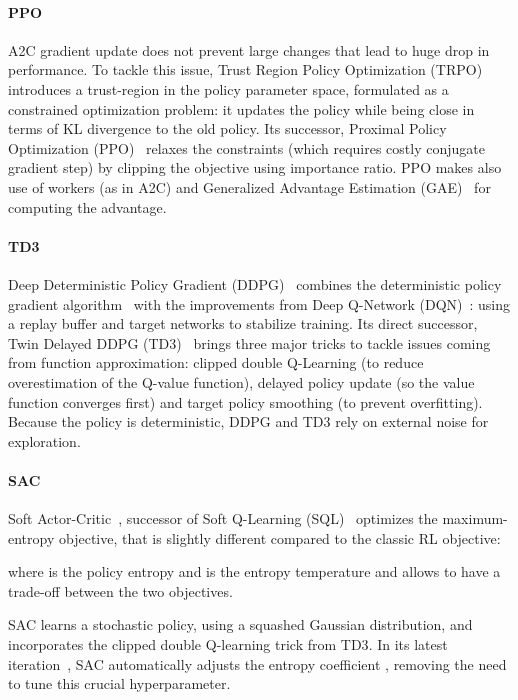 \documentclass{article}
\newcommand{\aac}{\textsc{A2C}\xspace}
\newcommand{\ppo}{\textsc{PPO}\xspace}
\newcommand{\sac}{\textsc{SAC}\xspace}
\newcommand{\tddd}{\textsc{TD3}\xspace}
\begin{document}
\paragraph{\ppo}
\aac gradient update does not prevent large changes that lead to huge drop in performance.
To tackle this issue, Trust Region Policy Optimization (TRPO)~\citep{schulman2015trust} introduces a trust-region in the policy parameter space, formulated as a constrained optimization problem: it updates the policy while being close in terms of KL divergence to the old policy.
Its successor, Proximal Policy Optimization (\ppo)~\citep{schulman2017proximal} relaxes the constraints (which requires costly conjugate gradient step) by clipping the objective using importance ratio. \ppo makes also use of workers (as in \aac) and Generalized Advantage Estimation (GAE)~\citep{schulman2015high} for computing the advantage.


\paragraph{\tddd}
Deep Deterministic Policy Gradient (DDPG)~\citep{lillicrap2015continuous} combines the deterministic policy gradient algorithm~\citep{silver2014deterministic} with the improvements from Deep Q-Network (DQN)~\citep{mnih2013playing}: using a replay buffer and target networks to stabilize training.
Its direct successor, Twin Delayed DDPG (\tddd)~\citep{fujimoto2018addressing} brings three major tricks to tackle issues coming from function approximation: clipped double Q-Learning (to reduce overestimation of the Q-value function), delayed policy update (so the value function converges first) and target policy smoothing (to prevent overfitting).
Because the policy is deterministic, DDPG and \tddd rely on external noise for exploration.


\paragraph{\sac}
Soft Actor-Critic~\citep{haarnoja2017reinforcement}, successor of Soft Q-Learning (SQL)~\citep{haarnoja2018soft} optimizes the maximum-entropy objective, that is slightly different compared to the classic RL objective:

where  is the policy entropy and  is the entropy temperature and allows to have a trade-off between the two objectives.

\sac learns a stochastic policy, using a squashed Gaussian distribution, and incorporates the clipped double Q-learning trick from \tddd.
In its latest iteration~\citep{haarnoja2018applications}, \sac automatically adjusts the entropy coefficient , removing the need to tune this crucial hyperparameter.
\end{document}
